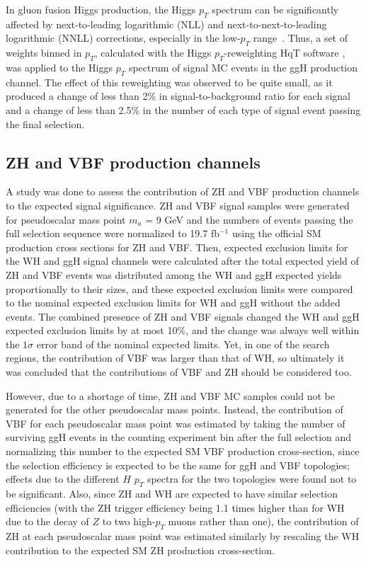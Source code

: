 In gluon fusion Higgs production, the Higgs $p_T$ spectrum can be significantly affected by next-to-leading logarithmic (NLL) and next-to-next-to-leading logarithmic (NNLL) corrections, especially in the low-$p_T$ range~\cite{Bozzi:2003jy}. Thus, a set of weights binned in $p_T$, calculated with the Higgs $p_T$-reweighting HqT software \cite{HQTDocumentation}, was applied to the Higgs $p_T$ spectrum of signal MC events in the ggH production channel. The effect of this reweighting was observed to be quite small, as it produced a change of less than 2\% in signal-to-background ratio for each signal and a change of less than 2.5\% in the number of each type of signal event passing the final selection.

\subsection{ZH and VBF production channels\label{sec:datasets-zhvbf}}

A study was done to assess the contribution of ZH and VBF production channels to the expected signal significance. ZH and VBF signal samples were generated for pseudoscalar mass point $m_{a}$ = 9 GeV and the numbers of events passing the full selection sequence were normalized to 19.7 fb$^{-1}$ using the official SM production cross sections for ZH and VBF. Then, expected exclusion limits for the WH and ggH signal channels were calculated after the total expected yield of ZH and VBF events was distributed among the WH and ggH expected yields proportionally to their sizes, and these expected exclusion limits were compared to the nominal expected exclusion limits for WH and ggH without the added events. The combined presence of ZH and VBF signals changed the WH and ggH expected exclusion limits by at most 10\%, and the change was always well within the $1\sigma$ error band of the nominal expected limits. Yet, in one of the search regions, the contribution of VBF was larger than that of WH, so ultimately it was concluded that the contributions of VBF and ZH should be considered too.

However, due to a shortage of time, ZH and VBF MC samples could not be generated for the other pseudoscalar mass points. Instead, the contribution of VBF for each pseudoscalar mass point was estimated by taking the number of surviving ggH events in the counting experiment bin after the full selection and normalizing this number to the expected SM VBF production cross-section, since the selection efficiency is expected to be the same for ggH and VBF topologies; effects due to the different $H$ $p_T$ spectra for the two topologies were found not to be significant. Also, since ZH and WH are expected to have similar selection efficiencies (with the ZH trigger efficiency being 1.1 times higher than for WH due to the decay of $Z$ to two high-$p_T$ muons rather than one), the contribution of ZH at each pseudoscalar mass point was estimated similarly by rescaling the WH contribution to the expected SM ZH production cross-section.